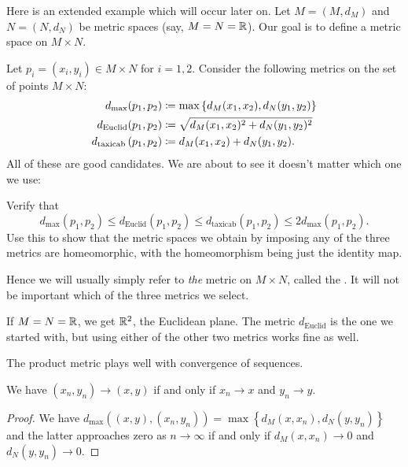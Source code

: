 Here is an extended example which will occur later on.
Let $M = (M, d_M)$ and $N = (N, d_N)$ be metric spaces (say, $M = N = \mathbb R$).
Our goal is to define a metric space on $M \times N$.

Let $p_i = (x_i,y_i) \in M \times N$ for $i=1,2$.
Consider the following metrics on the set of points $M \times N$:
\begin{align*}
	d_{\text{max}} ( p_1, p_2 )
		&\coloneqq \max \left\{ d_M(x_1, x_2), d_N(y_1, y_2) \right\}  \\
	d_{\text{Euclid}} ( p_1, p_2 )
		&\coloneqq \sqrt{d_M(x_1,x_2)^2 + d_N(y_1, y_2)^2} \\
	d_{\text{taxicab}} \left( p_1, p_2 \right)
		&\coloneqq d_M(x_1, x_2) + d_N(y_1, y_2).
\end{align*}
All of these are good candidates.
We are about to see it doesn't matter which one we use:
\begin{exercise}
Verify that
\[ d_{\text{max}}(p_1,p_2)
	\le d_{\text{Euclid}}(p_1, p_2)
	\le d_{\text{taxicab}}(p_1, p_2)
	\le 2d_{\text{max}}(p_1, p_2). \]
Use this to show that the metric spaces we obtain
by imposing any of the three metrics are homeomorphic,
with the homeomorphism being just the identity map.
\end{exercise}

\begin{definition}
	Hence we will usually simply refer to
	\emph{the} metric on $M \times N$,
	called the .
	It will not be important which of the three metrics we select.
\end{definition}

\begin{example}[$\RR^2$]
	If $M = N = \mathbb R$, we get $\RR^2$, the Euclidean plane.
	The metric $d_{\text{Euclid}}$ is the one we started with,
	but using either of the other two metrics works fine as well.
\end{example}

The product metric plays well with convergence of sequences.
\begin{proposition}
	We have $(x_n, y_n) \to (x,y)$
	if and only if $x_n \to x$ and $y_n \to y$.
\end{proposition}
\begin{proof}
	We have $d_{\text{max}} \left( (x,y), (x_n, y_n) \right)
	= \max\left\{ d_M(x, x_n), d_N(y, y_n) \right\}$
	and the latter approaches zero as $n \to \infty$
	if and only if $d_M(x,x_n) \to 0$ and $d_N(y, y_n) \to 0$.
\end{proof}

